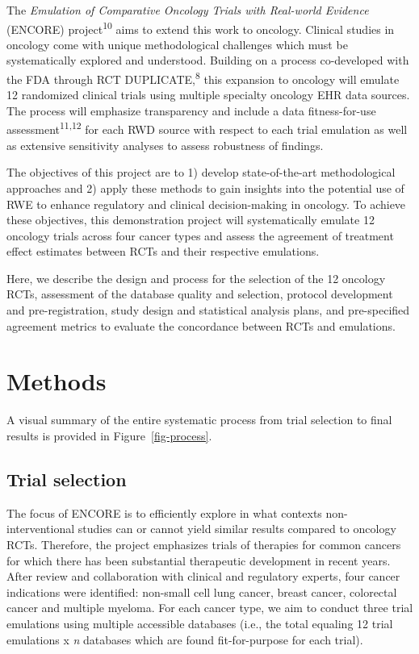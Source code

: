 \documentclass[
  letterpaper,
  DIV=11,
  numbers=noendperiod]{scrartcl}
\begin{document}
The \emph{Emulation of Comparative Oncology Trials with Real-world
Evidence} (ENCORE) project\textsuperscript{10} aims to extend this work
to oncology. Clinical studies in oncology come with unique
methodological challenges which must be systematically explored and
understood. Building on a process co-developed with the FDA through RCT
DUPLICATE,\textsuperscript{8} this expansion to oncology will emulate 12
randomized clinical trials using multiple specialty oncology EHR data
sources. The process will emphasize transparency and include a data
fitness-for-use assessment\textsuperscript{11,12} for each RWD source
with respect to each trial emulation as well as extensive sensitivity
analyses to assess robustness of findings.

The objectives of this project are to 1) develop state-of-the-art
methodological approaches and 2) apply these methods to gain insights
into the potential use of RWE to enhance regulatory and clinical
decision-making in oncology. To achieve these objectives, this
demonstration project will systematically emulate 12 oncology trials
across four cancer types and assess the agreement of treatment effect
estimates between RCTs and their respective emulations.

Here, we describe the design and process for the selection of the 12
oncology RCTs, assessment of the database quality and selection,
protocol development and pre-registration, study design and statistical
analysis plans, and pre-specified agreement metrics to evaluate the
concordance between RCTs and emulations.

\section{Methods}\label{methods}

A visual summary of the entire systematic process from trial selection
to final results is provided in Figure~\ref{fig-process}.

\subsection{Trial selection}\label{trial-selection}

The focus of ENCORE is to efficiently explore in what contexts
non-interventional studies can or cannot yield similar results compared
to oncology RCTs. Therefore, the project emphasizes trials of therapies
for common cancers for which there has been substantial therapeutic
development in recent years. After review and collaboration with
clinical and regulatory experts, four cancer indications were
identified: non-small cell lung cancer, breast cancer, colorectal cancer
and multiple myeloma. For each cancer type, we aim to conduct three
trial emulations using multiple accessible databases (i.e., the total
equaling 12 trial emulations x \emph{n} databases which are found
fit-for-purpose for each trial).
\end{document}
